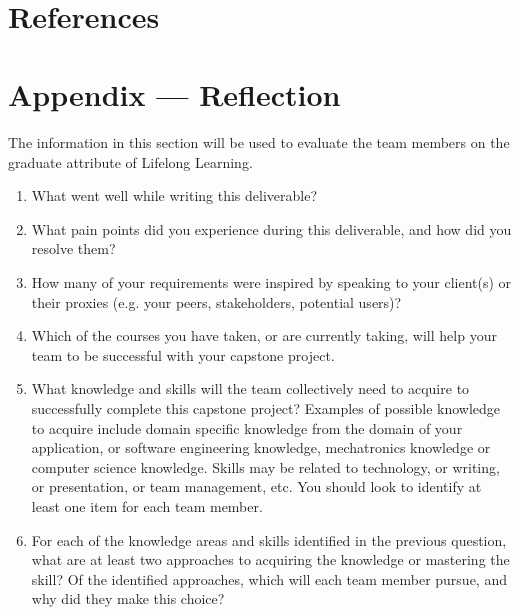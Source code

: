 \documentclass[12pt]{article}
\begin{document}
~\newpage

\section{References}

\newpage{}
\section*{Appendix --- Reflection}


The information in this section will be used to evaluate the team members on the
graduate attribute of Lifelong Learning.  



\begin{enumerate}
  \item What went well while writing this deliverable? 
  \item What pain points did you experience during this deliverable, and how did
  you resolve them?
  \item How many of your requirements were inspired by speaking to your
  client(s) or their proxies (e.g. your peers, stakeholders, potential users)?
  \item Which of the courses you have taken, or are currently taking, will help
  your team to be successful with your capstone project.
  \item What knowledge and skills will the team collectively need to acquire to
  successfully complete this capstone project?  Examples of possible knowledge
  to acquire include domain specific knowledge from the domain of your
  application, or software engineering knowledge, mechatronics knowledge or
  computer science knowledge.  Skills may be related to technology, or writing,
  or presentation, or team management, etc.  You should look to identify at
  least one item for each team member.
  \item For each of the knowledge areas and skills identified in the previous
  question, what are at least two approaches to acquiring the knowledge or
  mastering the skill?  Of the identified approaches, which will each team
  member pursue, and why did they make this choice?
\end{enumerate}
\end{document}
